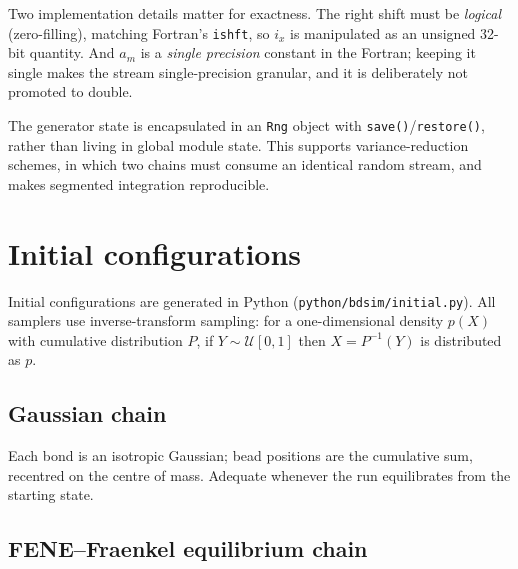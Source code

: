\documentclass[11pt,a4paper]{report}
\newcommand{\code}[1]{\texttt{\seqsplitcode{#1}}}
\newcommand{\seqsplitcode}[1]{#1}
\begin{document}
Two implementation details matter for exactness. The right shift must be
\emph{logical} (zero-filling), matching Fortran's \code{ishft}, so $i_x$ is
manipulated as an unsigned 32-bit quantity. And $a_m$ is a \emph{single
precision} constant in the Fortran; keeping it single makes the stream
single-precision granular, and it is deliberately not promoted to double.

The generator state is encapsulated in an \code{Rng} object with
\code{save()}/\code{restore()}, rather than living in global module state. This
supports variance-reduction schemes, in which two chains must consume an
identical random stream, and makes segmented integration reproducible.

\chapter{Initial configurations}
\label{ch:initial}

Initial configurations are generated in Python (\code{python/bdsim/initial.py}).
All samplers use inverse-transform sampling: for a one-dimensional density $p(X)$
with cumulative distribution $P$, if $Y\sim\mathcal{U}[0,1]$ then $X = P^{-1}(Y)$
is distributed as $p$.

\section{Gaussian chain}

Each bond is an isotropic Gaussian; bead positions are the cumulative sum,
recentred on the centre of mass. Adequate whenever the run equilibrates from the
starting state.

\section{FENE--Fraenkel equilibrium chain}
\end{document}
